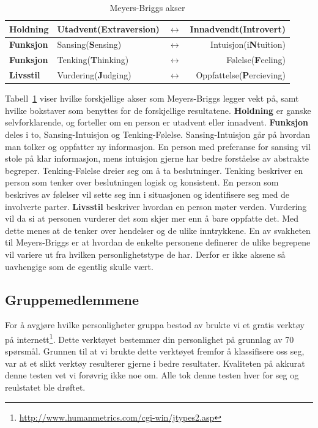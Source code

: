 \begin{table}[H]
    \centering
    \begin{tabular}{| l | l c r |}
        \hline
        \textbf{Holdning} & Utadvent(\textbf{E}xtraversion) & $\leftrightarrow$ & Innadvendt(\textbf{I}ntrovert) \\ \hline
        \textbf{Funksjon} & Sansing(\textbf{S}ensing) & $\leftrightarrow$ & Intuisjon(i\textbf{N}tuition) \\ \hline
        \textbf{Funksjon} & Tenking(\textbf{T}hinking) & $\leftrightarrow$ & Følelse(\textbf{F}eeling) \\ \hline
        \textbf{Livsstil} & Vurdering(\textbf{J}udging) & $\leftrightarrow$ & Oppfattelse(\textbf{P}ercieving) \\
        \hline
    \end{tabular}
    \label{tab:meyersbriggs}
    \caption{Meyers-Briggs akser}
\end{table}

Tabell~\ref{tab:meyersbriggs} viser hvilke forskjellige akser som Meyers-Briggs legger vekt på, samt hvilke bokstaver som benyttes for de forskjellige resultatene.
\textbf{Holdning} er ganske selvforklarende, og forteller om en person er utadvent eller innadvent. 
\textbf{Funksjon} deles i to, Sansing-Intuisjon og Tenking-Følelse. 
Sansing-Intuisjon går på hvordan man tolker og oppfatter ny informasjon. 
En person med preferanse for sansing vil stole på klar informasjon, mens intuisjon gjerne har bedre forståelse av abstrakte begreper. 
Tenking-Følelse dreier seg om å ta beslutninger. 
Tenking beskriver en person som tenker over beslutningen logisk og konsistent. 
En person som beskrives av følelser vil sette seg inn i situasjonen og identifisere seg med de involverte parter.
\textbf{Livsstil} beskriver hvordan en person møter verden. 
Vurdering vil da si at personen vurderer det som skjer mer enn å bare oppfatte det. 
Med dette menes at de tenker over hendelser og de ulike inntrykkene. 
En av svakheten til Meyers-Briggs er at hvordan de enkelte personene definerer de ulike begrepene vil variere ut fra hvilken personlighetstype de har. 
Derfor er ikke aksene så uavhengige som de egentlig skulle vært. 

\subsection{Gruppemedlemmene}
For å avgjøre hvilke personligheter gruppa bestod av brukte vi et gratis verktøy på internett\footnote{\url{http://www.humanmetrics.com/cgi-win/jtypes2.asp}}. 
Dette verktøyet bestemmer din personlighet på grunnlag av 70 spørsmål. 
Grunnen til at vi brukte dette verktøyet fremfor å klassifisere oss seg, var at et slikt verktøy resulterer gjerne i bedre resultater. 
Kvaliteten på akkurat denne testen vet vi forøvrig ikke noe om. 
Alle tok denne testen hver for seg og reulstatet ble drøftet. 

